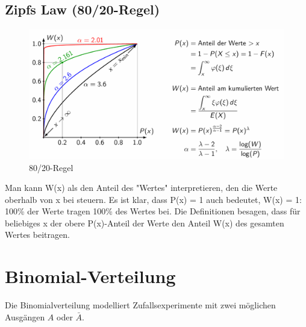 \documentclass[../Main.tex]{subfiles}
\begin{document}
\subsection{Zipfs Law (80/20-Regel)}

\begin{figure}[H]
    \centering
    \includegraphics[width=0.75\linewidth]{Images/80-20.png}
    \caption{80/20-Regel}
\end{figure}
Man kann W(x) als den Anteil des "Wertes" interpretieren, den die Werte oberhalb von x bei
steuern. Es ist klar, dass P(x) = 1 auch bedeutet, W(x) = 1: 100\% der Werte tragen 100\% des
 Wertes bei. Die Definitionen besagen, dass für beliebiges x der obere P(x)-Anteil der Werte den
 Anteil W(x) des gesamten Wertes beitragen.


\section{Binomial-Verteilung}
Die Binomialverteilung modelliert Zufallsexperimente mit zwei möglichen Ausgängen \(A\) oder \(\bar{A}\).
\end{document}
